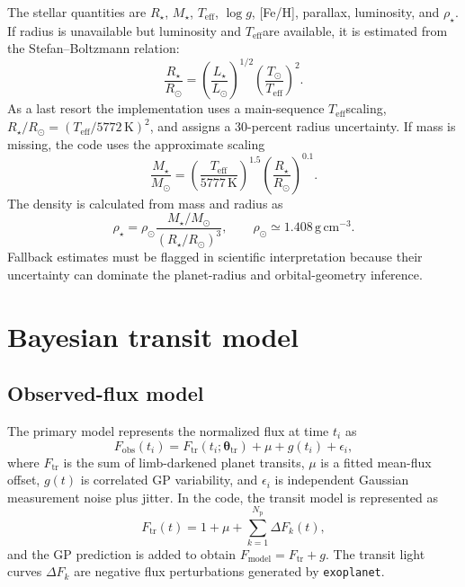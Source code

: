 \documentclass[12pt,a4paper,oneside]{report}
\newcommand{\SI}[2]{\ensuremath{#1\,\mathrm{#2}}}
\newcommand{\Msun}{\ensuremath{M_{\odot}}}
\newcommand{\Rsun}{\ensuremath{R_{\odot}}}
\newcommand{\Rstar}{\ensuremath{R_{\star}}}
\newcommand{\Mstar}{\ensuremath{M_{\star}}}
\newcommand{\Teff}{\ensuremath{T_{\mathrm{eff}}}}
\newcommand{\rhoStar}{\ensuremath{\rho_{\star}}}
\newcommand{\code}[1]{\texttt{\small #1}}
\begin{document}
The stellar quantities are \(\Rstar\), \(\Mstar\), \Teff, \(\log g\), [Fe/H],
parallax, luminosity, and \rhoStar. If radius is unavailable but luminosity and
\Teff are available, it is estimated from the Stefan--Boltzmann relation:
\begin{equation}
  \frac{\Rstar}{\Rsun}=\left(\frac{L_\star}{L_\odot}\right)^{1/2}
  \left(\frac{T_{\odot}}{\Teff}\right)^2.
\end{equation}
As a last resort the implementation uses a main-sequence \Teff scaling,
\(\Rstar/\Rsun=(\Teff/5772\,\mathrm{K})^2\), and assigns a 30-percent radius
uncertainty. If mass is missing, the code uses the approximate scaling
\begin{equation}
  \frac{\Mstar}{\Msun}=
  \left(\frac{\Teff}{5777\,\mathrm{K}}\right)^{1.5}
  \left(\frac{\Rstar}{\Rsun}\right)^{0.1}.
\end{equation}
The density is calculated from mass and radius as
\begin{equation}
  \rhoStar=\rho_\odot\frac{\Mstar/\Msun}{(\Rstar/\Rsun)^3},
  \qquad \rho_\odot\simeq\SI{1.408}{g\,cm^{-3}}.
\end{equation}
Fallback estimates must be flagged in scientific interpretation because their
uncertainty can dominate the planet-radius and orbital-geometry inference.

\chapter{Bayesian transit model}
\section{Observed-flux model}
The primary model represents the normalized flux at time \(t_i\) as
\begin{equation}
  F_{\mathrm{obs}}(t_i)=F_{\mathrm{tr}}(t_i;\boldsymbol{\theta}_{\mathrm{tr}})
  + \mu + g(t_i)+\epsilon_i,
\end{equation}
where \(F_{\mathrm{tr}}\) is the sum of limb-darkened planet transits, \(\mu\)
is a fitted mean-flux offset, \(g(t)\) is correlated GP variability, and
\(\epsilon_i\) is independent Gaussian measurement noise plus jitter. In the
code, the transit model is represented as
\begin{equation}
  F_{\mathrm{tr}}(t)=1+\mu+\sum_{k=1}^{N_{\mathrm{p}}}\Delta F_k(t),
\end{equation}
and the GP prediction is added to obtain \(F_{\mathrm{model}}
=F_{\mathrm{tr}}+g\). The transit light curves \(\Delta F_k\) are negative
flux perturbations generated by \code{exoplanet}.
\end{document}
